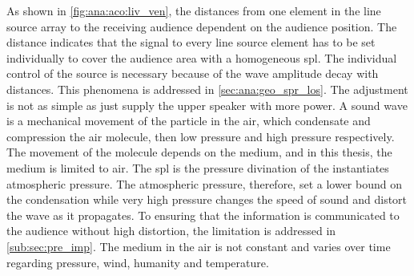 
As shown in \autoref{fig:ana:aco:liv_ven}, the distances from one element in the line source array to the receiving audience dependent on the audience position. The distance indicates that the signal to every line source element has to be set individually to cover the audience area with a homogeneous \gls{spl}. The individual control of the source is necessary because of the wave amplitude decay with distances. This phenomena is addressed in \autoref{sec:ana:geo_spr_los}. The adjustment is not as simple as just supply the upper speaker with more power. A sound wave is a mechanical movement of the particle in the air, which condensate and compression the air molecule, then low pressure and high pressure respectively. The movement of the molecule depends on the medium, and in this thesis, the medium is limited to air. The \gls{spl} is the pressure divination of the instantiates atmospheric pressure. The atmospheric pressure, therefore, set a lower bound on the condensation while very high pressure changes the speed of sound and distort the wave as it propagates. To ensuring that the information is communicated to the audience without high distortion, the limitation is addressed in \autoref{sub:sec:pre_imp}.  The medium in the air is not constant and varies over time regarding pressure, wind, humanity and temperature. 


